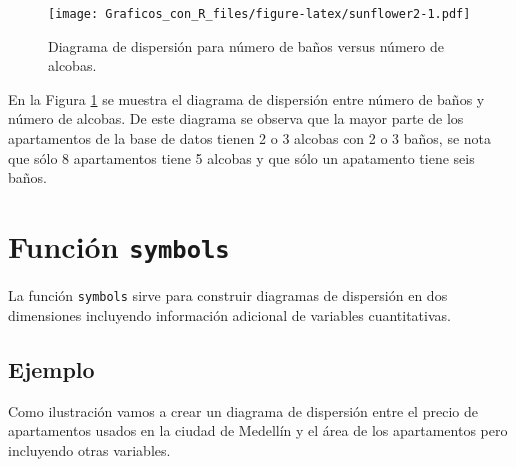 \documentclass[10pt,]{krantz}
\begin{document}
\begin{figure}
\centering
\texttt{[image: Graficos\_con\_R\_files/figure-latex/sunflower2-1.pdf]}
\caption{\label{fig:sunflower2}Diagrama de dispersión para número de baños
versus número de alcobas.}
\end{figure}

En la Figura \ref{fig:sunflower2} se muestra el diagrama de dispersión
entre número de baños y número de alcobas. De este diagrama se observa
que la mayor parte de los apartamentos de la base de datos tienen 2 o 3
alcobas con 2 o 3 baños, se nota que sólo 8 apartamentos tiene 5 alcobas
y que sólo un apatamento tiene seis baños.

\section{\texorpdfstring{Función \texttt{symbols}
}{Función symbols }}\label{funcion-symbols}

La función \texttt{symbols} sirve para construir diagramas de dispersión
en dos dimensiones incluyendo información adicional de variables
cuantitativas.

\subsection*{Ejemplo}\label{ejemplo-13}


Como ilustración vamos a crear un diagrama de dispersión entre el precio
de apartamentos usados en la ciudad de Medellín y el área de los
apartamentos pero incluyendo otras variables.
\end{document}
